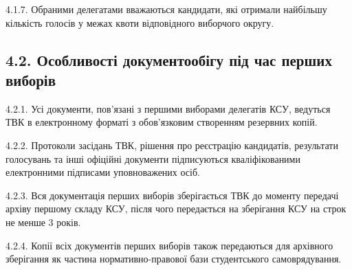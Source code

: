     4.1.7. Обраними делегатами вважаються кандидати, які отримали найбільшу кількість голосів у межах квоти відповідного виборчого округу.




\subsection*{4.2. Особливості документообігу під час перших виборів}
    4.2.1. Усі документи, пов'язані з першими виборами делегатів КСУ, ведуться ТВК в електронному форматі з обов'язковим створенням резервних копій.

    4.2.2. Протоколи засідань ТВК, рішення про реєстрацію кандидатів, результати голосувань та інші офіційні документи підписуються кваліфікованими електронними підписами уповноважених осіб.

    4.2.3. Вся документація перших виборів зберігається ТВК до моменту передачі архіву першому складу КСУ, після чого передається на зберігання КСУ на строк не менше 3 років.

    4.2.4. Копії всіх документів перших виборів також передаються для архівного зберігання як частина нормативно-правової бази студентського самоврядування.